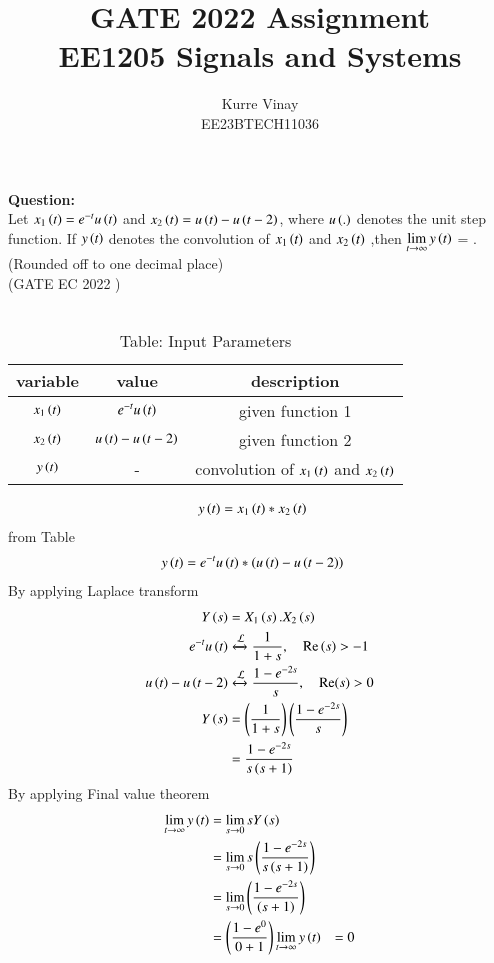 \documentclass[a4,12pt,onecolumn]{IEEEtran}
\begin{document}
\title{
\Huge\textbf{ GATE 2022 Assignment}\\
\Huge\textbf{EE1205} Signals and Systems\\
}
\large\author{Kurre Vinay\\EE23BTECH11036}
\maketitle
\textbf{Question:}\\
Let $x_1\left(t\right) = e^{-t}u\left(t\right)$ and $x_2\left(t\right) =u\left(t\right)-u\left(t-2\right)$, where $u\left(.\right)$ denotes the unit step function. If $y\left(t\right)$ denotes the convolution of $x_1\left(t\right)$ and $x_2\left(t\right)$ ,then $\lim\limits_{t \to \infty} y\left(t\right)$ = \underline{\hspace{1cm}}. (Rounded off to one decimal place)\\
\hfill(GATE EC 2022 )\\
\solution\\
\begin{table}[ht!]
\begin{center}
\label{table1:example}
\begin{tabular}{|c|c|c|}
   \hline
   variable&value&description\\
   \hline
   $x_1\left(t\right)$& $e^{-t}u\left(t\right)$&given function 1\\
   \hline
   $x_2\left(t\right)$&$u\left(t\right)-u\left(t-2\right)$&given function 2\\
    \hline
    $y\left(t\right)$&-& convolution of $x_1\left(t\right)$ and $x_2\left(t\right)$\\
    \hline
\end{tabular}
\caption{Table: Input Parameters}
\label{tab:1}
\end{center}
\end{table}
\begin{align}
y\left(t\right) &= x_1\left(t\right)*x_2\left(t\right)
\end{align}
from Table 
\begin{align}
y\left(t\right) &= e^{-t}u\left(t\right)*\left(u\left(t\right)-u\left(t-2\right)\right)
\end{align}
By applying Laplace transform
\begin{align}
Y\left(s\right)&=X_1\left(s\right).X_2\left(s\right)\\
e^{-t}u\left(t\right)&\xleftrightarrow{\mathcal{L}}\frac{1}{1+s} , \quad{ \text{Re}\ensuremath{\left(s\right)}>-1}\\
u\left(t\right)-u\left(t-2\right)&\xleftrightarrow{\mathcal{L}}\frac{1-e^{-2s}}{s} ,\quad{\text{Re}(s) > 0}\\
Y\left(s\right)&=\left(\frac{1}{1+s}\right)\left(\frac{1-e^{-2s}}{s}\right)\\
&=\frac{1-e^{-2s}}{s\left(s+1\right)}
\end{align}
By applying Final value theorem
\begin{align}
\lim\limits_{t \to \infty} y\left(t\right) &= \lim\limits_{s \to 0} sY\left(s\right)\\
&=\lim\limits_{s \to 0} s\left(\frac{1-e^{-2s}}{s\left(s+1\right)}\right)\\
&=\lim\limits_{s \to 0} \left(\frac{1-e^{-2s}}{\left(s+1\right)}\right)\\
&= \left(\frac{1-e^{0}}{0+1}\right)
\lim\limits_{t \to \infty} y\left(t\right) &= 0
\end{align}
\end{document}
